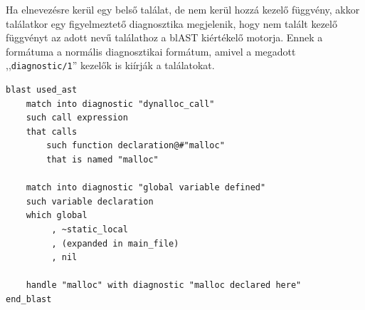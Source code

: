 Ha elnevezésre kerül egy belső találat, de nem kerül hozzá kezelő függvény, akkor találatkor egy figyelmeztető diagnosztika megjelenik, hogy nem talált kezelő függvényt az adott nevű találathoz a blAST kiértékelő motorja.
Ennek a formátuma a normális diagnosztikai formátum, amivel a megadott ,,{\tt diagnostic/1}'' kezelők is kiírják a találatokat.

\begin{lstlisting}[caption={Összetett keresések blAST-ban},label={lst:complex}]
blast used_ast
	match into diagnostic "dynalloc_call"
	such call expression
	that calls
		such function declaration@#"malloc"
		that is named "malloc"

	match into diagnostic "global variable defined"
	such variable declaration
	which global
		 , ~static_local
		 , (expanded in main_file)
		 , nil
	
	handle "malloc" with diagnostic "malloc declared here"
end_blast
\end{lstlisting}

